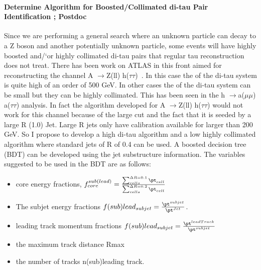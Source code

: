 \documentclass[11pt]{article}
\newcommand{\too}{$\rightarrow$}
\begin{document}
\paragraph{Determine Algorithm for Boosted/Collimated di-tau Pair Identification ; Postdoc} %
Since we are performing a general search where an unknown particle can decay to a Z boson and another potentially unknown particle, some events will have highly boosted and/`or highly collimated di-tau pairs that regular
tau reconstruction does not treat.  There has been work on ATLAS in this front aimed for reconstructing the channel A \too Z(ll) h($\tau\tau$)~\cite{di-tau-thesis}.  In this case the \pt of the di-tau system is quite high of an order of 500 GeV.
In other cases the \pt of the di-tau system can be small but they can be highly collimated.  This has been seen in the h \too a($\mu \mu$) a($\tau \tau$) analysis.  In fact the algorithm developed for A \too Z(ll) h($\tau\tau$) would not 
work for this channel because of the large \pt cut and the fact that it is seeded by a large R (1.0) Jet.  Large R jets only have calibration available for \pt larger than 200 GeV.  So I propose to develop a high \pt di-tau
algorithm and a low \pt highly collimated algorithm where standard jets of R of 0.4 can be used. A boosted decision tree (BDT) can be developed using the jet substructure information.  
The variables suggested to be used in the BDT are as follows:
\begin{itemize}
\item{core energy fractions, $f_{core}^{sub(lead)}=\frac{\sum_{cells}^{\Delta R=0.1} \pt_{cell}}{\sum_{cells}^{\Delta R=0.2}\pt_{cell}} $}
\item {The subjet energy fractions $f(sub)lead_{subjet}=\frac{\pt^{subjet}}{\pt^{Jet}}$. }
\item{leading track momentum fractions $f(sub)lead_{subjet}=\frac{\pt ^{leadTrack}}{\pt^{subjet}}$}
\item{the maximum track distance Rmax}
\item{the number of tracks n(sub)leading track.}
\end{itemize}
\end{document}
